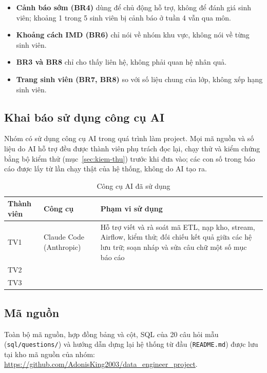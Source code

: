 \begin{itemize}
  \item \textbf{Cảnh báo sớm (BR4)} dùng để chủ động hỗ trợ, không để đánh giá sinh viên; khoảng 1
        trong 5 sinh viên bị cảnh báo ở tuần 4 vẫn qua môn.
  \item \textbf{Khoảng cách IMD (BR6)} chỉ nói về nhóm khu vực, không nói về từng sinh viên.
  \item \textbf{BR3 và BR8} chỉ cho thấy liên hệ, không phải quan hệ nhân quả.
  \item \textbf{Trang sinh viên (BR7, BR8)} so với số liệu chung của lớp, không xếp hạng sinh viên.
\end{itemize}

\subsection{Khai báo sử dụng công cụ AI}
\label{sec:khai-bao-ai}

Nhóm có sử dụng công cụ AI trong quá trình làm project. Mọi mã nguồn và số liệu do AI hỗ trợ đều
được thành viên phụ trách đọc lại, chạy thử và kiểm chứng bằng bộ kiểm thử
(mục~\ref{sec:kiem-thu}) trước khi đưa vào; các con số trong báo cáo được lấy từ lần chạy thật của
hệ thống, không do AI tạo ra.

\begin{table}[htbp]
\centering
\small
\begin{tabularx}{\textwidth}{|l|l|X|}
\hline
\textbf{Thành viên} & \textbf{Công cụ} & \textbf{Phạm vi sử dụng} \\ \hline
TV1 & Claude Code (Anthropic) & Hỗ trợ viết và rà soát mã ETL, nạp kho, stream, Airflow, kiểm thử; đối chiếu kết quả giữa các hệ lưu trữ; soạn nháp và sửa câu chữ một số mục báo cáo \\ \hline
TV2 & %
 & %
 \\ \hline
TV3 & %
 & %
 \\ \hline
\end{tabularx}
\caption{Công cụ AI đã sử dụng}
\label{tab:khai-bao-ai}
\end{table}

\subsection{Mã nguồn}
Toàn bộ mã nguồn, hợp đồng bảng và cột, SQL của 20 câu hỏi mẫu
(\texttt{sql/questions/}) và hướng dẫn dựng lại hệ thống từ đầu (\texttt{README.md}) được lưu tại kho mã nguồn của nhóm:
\url{https://github.com/AdonisKing2003/data_engineer_project}.
